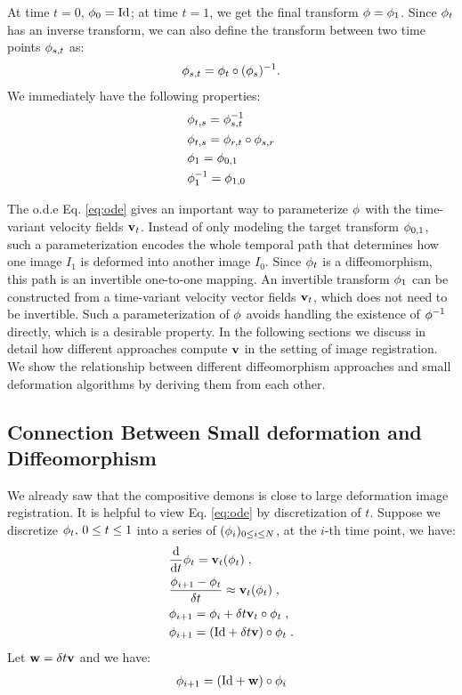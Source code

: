 \documentclass[letterpaper,12pt]{article}
\begin{document}
At time $t=0$, $\phi_0 = \text{Id}$; at time $t=1$, we get the final
transform $\phi = \phi_1$. Since $\phi_t$ has an inverse transform, we can also define the transform between two time points $\phi_{s,t}$ as:
\begin{align}
\phi_{s,t} = \phi_t \circ (\phi_s)^{-1}.
\end{align}
We immediately have the following properties:
\begin{align}
& \phi_{t, s} = \phi_{s, t}^{-1} \\
& \phi_{t, s} = \phi_{r, t} \circ \phi_{s, r} \\
& \phi_1 = \phi_{0, 1} \\
& \phi_1^{-1} = \phi_{1, 0}
\label{eq:invphi}
\end{align}

The o.d.e Eq. \ref{eq:ode} gives an important way to parameterize
$\phi$ with the time-variant velocity fields $\mathbf{v}_t$. Instead of only
modeling the target transform $\phi_{0,1}$, such a parameterization
encodes the whole temporal path that determines how one image $I_1$ is
deformed into another image $I_0$. Since $\phi_t$ is a
diffeomorphism, this path is an invertible one-to-one mapping. An
invertible transform $\phi_1$ can be constructed from a time-variant
velocity vector fields $\mathbf{v}_t$, which does not need to be
invertible. Such a parameterization of $\phi$ avoids handling the existence of $\phi^{-1}$ directly, which is a desirable property. In the following sections we discuss in detail how different approaches compute $\mathbf{v}$ in the setting of image registration. We show the relationship between different diffeomorphism approaches and small deformation algorithms by deriving them from each other.

\subsection{Connection Between Small deformation and Diffeomorphism}

We already saw that the compositive demons is close to large deformation image registration. It is helpful to view Eq. \ref{eq:ode} by discretization of $t$. Suppose we discretize $\phi_t, \, 0\leq t \leq 1$ into a series of $(\phi_i)_{0 \leq i \leq N}$, at the $i$-th time point, we have:
\begin{equation}
\begin{split}
& \frac{\text{d}}{\text{d} t} \phi_t = \mathbf{v}_t(\phi_t) \; , \\
& \frac{\phi_{i+1}-\phi_{t}}{\delta t} \approx \mathbf{v}_t(\phi_t) \; , \\
& \phi_{i+1} = \phi_{i} + \delta t \mathbf{v}_t \circ \phi_t \; , \\
& \phi_{i+1} = (\text{Id} + \delta t \mathbf{v}) \circ \phi_t \; .\\
\end{split}
\label{eq:discretizeode}
\end{equation}
Let $\mathbf{w} = \delta t \mathbf{v}$ and we have:
\begin{align}
\phi_{i+1} = (\text{Id} + \mathbf{w}) \circ \phi_i
\end{align}
\end{document}
